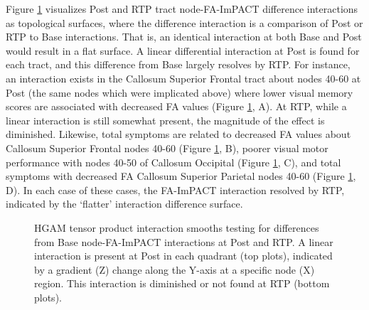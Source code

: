 \documentclass[12pt]{article}
\begin{document}
Figure \ref{fig:lgio-intx-cc} visualizes Post and RTP tract node-FA-ImPACT difference interactions as topological surfaces, where the difference interaction is a comparison of Post or RTP to Base interactions. That is, an identical interaction at both Base and Post would result in a flat surface. A linear differential interaction at Post is found for each tract, and this difference from Base largely resolves by RTP. For instance, an interaction exists in the Callosum Superior Frontal tract about nodes 40-60 at Post (the same nodes which were implicated above) where lower visual memory scores are associated with decreased FA values (Figure \ref{fig:lgio-intx-cc}, A). At RTP, while a linear interaction is still somewhat present, the magnitude of the effect is diminished. Likewise, total symptoms are related to decreased FA values about Callosum Superior Frontal nodes 40-60 (Figure \ref{fig:lgio-intx-cc}, B), poorer visual motor performance with nodes 40-50 of Callosum Occipital (Figure \ref{fig:lgio-intx-cc}, C), and total symptoms with decreased FA Callosum Superior Parietal nodes 40-60 (Figure \ref{fig:lgio-intx-cc}, D). In each case of these cases, the FA-ImPACT interaction resolved by RTP, indicated by the `flatter' interaction difference surface.

\begin{figure}[H]
	\centering
	\caption{HGAM tensor product interaction smooths testing for differences from Base node-FA-ImPACT interactions at Post and RTP. A linear interaction is present at Post in each quadrant (top plots), indicated by a gradient (Z) change along the Y-axis at a specific node (X) region. This interaction is diminished or not found at RTP (bottom plots).}
	\label{fig:lgio-intx-cc}
\end{figure}
\end{document}
